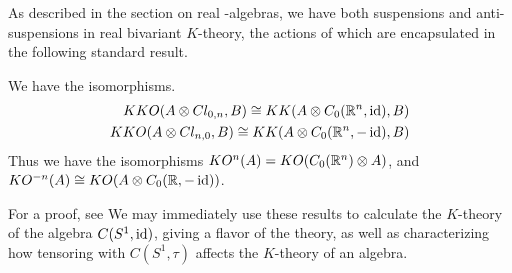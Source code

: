 As described in the section on real \Cstar-algebras, we have both suspensions and anti-suspensions in real bivariant $K$-theory, the actions of which are encapsulated in the following standard result. %
\begin{lemma}
	We have the isomorphisms.
	\begin{align*}
		KKO(A\otimes Cl_{0,n},B)\cong KK(A\otimes C_0(\mathbb{R}^n,\operatorname{id}),B) \\
		KKO(A\otimes Cl_{n,0},B)\cong KK(A\otimes C_0(\mathbb{R}^n,-\operatorname{id}),B)
	\end{align*}
	Thus we have the isomorphisms $KO^n(A)=KO(C_0(\mathbb{R}^n)\otimes A)$, and $KO^{-n}(A)\cong KO(A\otimes C_0(\mathbb{R},-\operatorname{id}))$. 
\end{lemma}
For a proof, see \cite{kasparov}
We may immediately use these results to calculate the $K$-theory of the algebra $C(S^1,\operatorname{id})$, giving a flavor of the theory, as well as characterizing how tensoring with $C(S^1,\tau)$ affects the $K$-theory of an algebra. 

